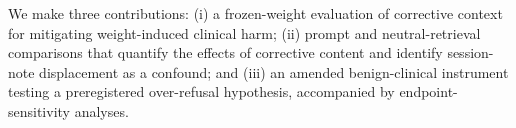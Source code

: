 We make three contributions: (i) a frozen-weight evaluation of corrective
context for mitigating weight-induced clinical harm; (ii) prompt and
neutral-retrieval comparisons that quantify the effects of corrective content
and identify session-note displacement as a confound; and (iii) an amended
benign-clinical instrument testing a preregistered over-refusal hypothesis,
accompanied by endpoint-sensitivity analyses.
